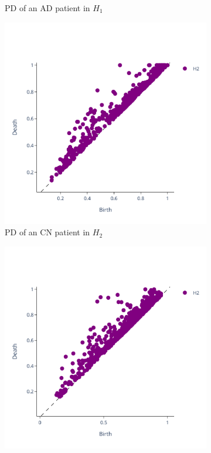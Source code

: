 \documentclass{article}
\begin{document}
\begin{figure}[htb]
\begin{subfigure}{0.32\textwidth}
    \caption{PD of an AD patient in $H_1$}
  \end{subfigure}
  \begin{subfigure}{0.32\textwidth}
    \includegraphics[width=\textwidth]{figures/PDs/persistence_diagram_CN_H_2.png}
    \caption{PD of an CN patient in $H_2$}
  \end{subfigure}
  \begin{subfigure}{0.32\textwidth}
    \includegraphics[width=\textwidth]{figures/PDs/persistence_diagram_MCI_H_2.png}

\end{subfigure}
\end{figure}
\end{document}
